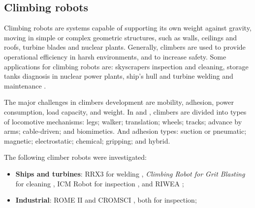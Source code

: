 \subsection{Climbing robots}\label{sota_climbers}
Climbing robots are systems capable of supporting its own weight against
gravity, moving in simple or complex geometric structures, such as
walls, ceilings and roofs, turbine blades and nuclear plants.
Generally, clim\-bers are used to provide operational efficiency in harsh
environments, and to increase safety. Some applications for
climbing robots are:
skyscrapers inspection and cleaning, storage tanks diagnosis in nuclear
power plants, ship's hull and turbine welding and
maintenance \citep{armada2003application}.

The major challenges in climbers development are mobility, adhesion,
power consumption, load capacity, and weight. In \cite{modular} and \cite{climbsurv},
climbers are divided into types of locomotive mechanisms: legs; walker; translation; wheels; tracks;
advance by arms; cable-driven; and biomimetics. And adhesion types:
suction or pneumatic; magnetic; electrostatic; chemical; gripping; and hybrid.

The following climber robots were investigated:

\begin{itemize}
  \item \textbf{Ships and turbines}: RRX3 for welding
   \citep{rrx3}, \textit{Climbing Robot for Grit Blasting} for cleaning
   \citep{crgb}, ICM Robot for inspection \citep{icm}, and RIWEA \citep{riwea};
  \item \textbf{Industrial}: ROME II \citep{roma} and CROMSCI \citep{CROMSCI}, both for inspection;
\end{itemize}

